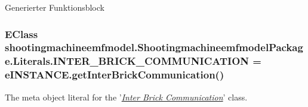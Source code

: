 Generierter Funktionsblock \hypertarget{interfaceshootingmachineemfmodel_1_1_shootingmachineemfmodel_package_1_1_literals_a9744d5c3be118507d7e7c661b7882d4e}{
\subsubsection[{I\-N\-T\-E\-R\-\_\-\-B\-R\-I\-C\-K\-\_\-\-C\-O\-M\-M\-U\-N\-I\-C\-A\-T\-I\-O\-N}]{\setlength{\rightskip}{0pt plus 5cm}E\-Class shootingmachineemfmodel.\-Shootingmachineemfmodel\-Package.\-Literals.\-I\-N\-T\-E\-R\-\_\-\-B\-R\-I\-C\-K\-\_\-\-C\-O\-M\-M\-U\-N\-I\-C\-A\-T\-I\-O\-N = e\-I\-N\-S\-T\-A\-N\-C\-E.\-get\-Inter\-Brick\-Communication()}}\label{interfaceshootingmachineemfmodel_1_1_shootingmachineemfmodel_package_1_1_literals_a9744d5c3be118507d7e7c661b7882d4e}
The meta object literal for the '\hyperlink{classshootingmachineemfmodel_1_1impl_1_1_inter_brick_communication_impl}{{\itshape Inter Brick Communication}}' class.

